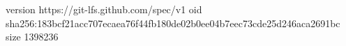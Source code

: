 version https://git-lfs.github.com/spec/v1
oid sha256:183bcf21acc707ecaea76f44fb180de02b0ee04b7eec73cde25d246aca2691bc
size 1398236
